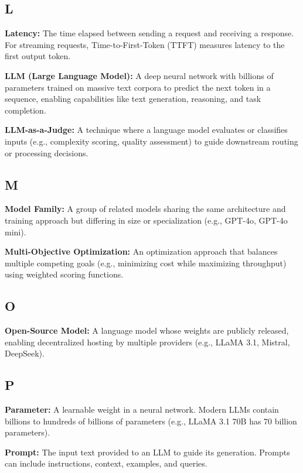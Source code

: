 \documentclass[english]{article}
\begin{document}
\subsection*{L}

\textbf{Latency:} The time elapsed between sending a request and receiving a response. For streaming requests, Time-to-First-Token (TTFT) measures latency to the first output token.

\textbf{LLM (Large Language Model):} A deep neural network with billions of parameters trained on massive text corpora to predict the next token in a sequence, enabling capabilities like text generation, reasoning, and task completion.

\textbf{LLM-as-a-Judge:} A technique where a language model evaluates or classifies inputs (e.g., complexity scoring, quality assessment) to guide downstream routing or processing decisions.

\subsection*{M}

\textbf{Model Family:} A group of related models sharing the same architecture and training approach but differing in size or specialization (e.g., GPT-4o, GPT-4o mini).

\textbf{Multi-Objective Optimization:} An optimization approach that balances multiple competing goals (e.g., minimizing cost while maximizing throughput) using weighted scoring functions.

\subsection*{O}

\textbf{Open-Source Model:} A language model whose weights are publicly released, enabling decentralized hosting by multiple providers (e.g., LLaMA 3.1, Mistral, DeepSeek).

\subsection*{P}

\textbf{Parameter:} A learnable weight in a neural network. Modern LLMs contain billions to hundreds of billions of parameters (e.g., LLaMA 3.1 70B has 70 billion parameters).

\textbf{Prompt:} The input text provided to an LLM to guide its generation. Prompts can include instructions, context, examples, and queries.
\end{document}
